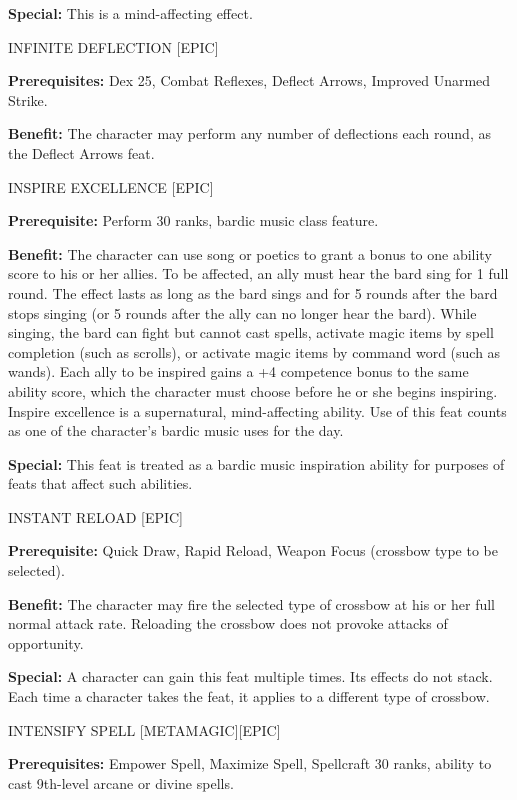 \documentclass{article}
\begin{document}
\textbf{Special:} This is a mind-affecting effect. 

\vspace{12pt}
INFINITE DEFLECTION [EPIC]

\textbf{Prerequisites:} Dex 25, Combat Reflexes, Deflect Arrows, Improved Unarmed 
Strike. 

\textbf{Benefit:} The character may perform any number of deflections each round, 
as the Deflect Arrows feat.

\vspace{12pt}
INSPIRE EXCELLENCE [EPIC] 

\textbf{Prerequisite:} Perform 30 ranks, bardic music class feature. 

\textbf{Benefit:} The character can use song or poetics to grant a bonus to one 
ability score to his or her allies. To be affected, an ally must hear the bard 
sing for 1 full round. The effect lasts as long as the bard sings and for 5 rounds 
after the bard stops singing (or 5 rounds after the ally can no longer hear the 
bard). While singing, the bard can fight but cannot cast spells, activate magic 
items by spell completion (such as scrolls), or activate magic items by command 
word (such as wands). Each ally to be inspired gains a +4 competence bonus to the 
same ability score, which the character must choose before he or she begins inspiring. 
Inspire excellence is a supernatural, mind-affecting ability. Use of this feat 
counts as one of the character's bardic music uses for the day.

\textbf{Special:} This feat is treated as a bardic music inspiration ability for 
purposes of feats that affect such abilities. 

\vspace{12pt}
INSTANT RELOAD [EPIC]

\textbf{Prerequisite:} Quick Draw, Rapid Reload, Weapon Focus (crossbow type to 
be selected). 

\textbf{Benefit:} The character may fire the selected type of crossbow at his or 
her full normal attack rate. Reloading the crossbow does not provoke attacks of 
opportunity. 

\textbf{Special:} A character can gain this feat multiple times. Its effects do 
not stack. Each time a character takes the feat, it applies to a different type 
of crossbow. 

\vspace{12pt}
INTENSIFY SPELL [METAMAGIC][EPIC] 

\textbf{Prerequisites:} Empower Spell, Maximize Spell, Spellcraft 30 ranks, ability 
to cast 9th-level arcane or divine spells. 
\end{document}

